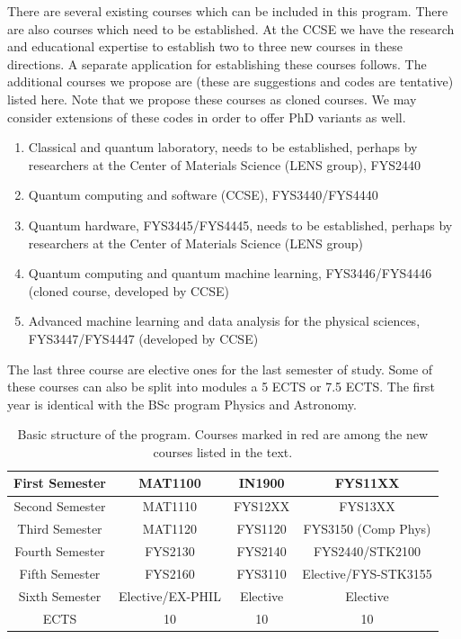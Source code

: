 \documentclass[aps,rmp,preprint,amsmath,amssymb,graphicx,longbibliography]{revtex4-1}
\begin{document}
There are several existing courses which can be included in this program. There are also courses which need to be established. At the CCSE we have the research and educational expertise to establish two to three new courses in these directions.
A separate application for establishing these courses follows. The additional courses we propose are (these are suggestions and codes are tentative) listed here. Note that we propose these courses as cloned courses. We may consider extensions of these codes in order to offer PhD variants as well.



\begin{enumerate}
    \item \color{red} Classical and quantum laboratory, needs to be established, perhaps by researchers at the Center of Materials Science (LENS group), FYS2440
    \item Quantum computing and software (CCSE), FYS3440/FYS4440
    \item Quantum hardware, FYS3445/FYS4445, needs to be established, perhaps by researchers at the Center of Materials Science (LENS group)
    \item Quantum computing and quantum machine learning, FYS3446/FYS4446 (cloned course, developed by CCSE)
    \item Advanced machine learning and data analysis for the physical sciences, FYS3447/FYS4447 (developed by CCSE)
\end{enumerate}

The last three course are elective ones for the last semester of study. Some of these courses can also be split into modules a 5 ECTS or 7.5 ECTS.
The first year is identical with the BSc program Physics and Astronomy.

\begin{table}
 \caption{Basic structure of the program. Courses marked in red are among the new courses listed in the text.}
    \centering
    \begin{tabular}{|c|c|c|c|} \hline
    First Semester & MAT1100 &  IN1900   & FYS11XX  \\ \hline 
    Second Semester & MAT1110 & FYS12XX  & FYS13XX \\ \hline
    Third Semester & MAT1120 &   FYS1120  &  FYS3150 (Comp Phys)\\ \hline
    Fourth Semester & FYS2130 & FYS2140    & \color{red} {FYS2440}/STK2100 \\ \hline       
    Fifth Semester & FYS2160 & FYS3110     & \color{red}Elective/FYS-STK3155 \\ \hline
    Sixth Semester & \color{red} Elective/EX-PHIL & \color{red} Elective    & \color{red} Elective \\ \hline
   ECTS & 10 &  10   &  10  \\ \hline    
    \end{tabular}
\end{table}



\end{document}
